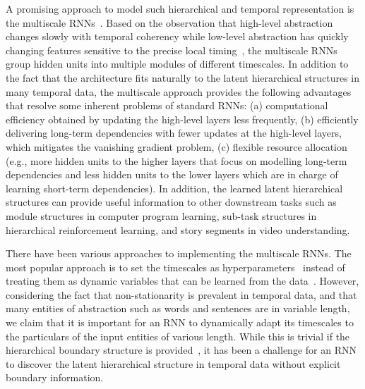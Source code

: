 \documentclass{article} %
\begin{document}
A promising approach to model such hierarchical and temporal representation is the multiscale RNNs~\citep{schmidhuber1992learning,el1995hierarchical,koutnik2014clockwork}.
Based on the observation that high-level abstraction changes slowly with temporal coherency 
while low-level abstraction has quickly changing features sensitive to the precise local timing~\citep{el1995hierarchical}, 
the multiscale RNNs group hidden units into multiple modules of different timescales. 
In addition to the fact that the architecture fits naturally to the latent hierarchical structures in many temporal data, 
the multiscale approach provides the following advantages that resolve some inherent problems of standard RNNs: 
(a) computational efficiency obtained by updating the high-level layers less frequently, 
(b) efficiently delivering long-term dependencies with fewer updates at the high-level layers, which mitigates the vanishing gradient problem, 
(c) flexible resource allocation (e.g., more hidden units to the higher layers that focus on modelling long-term dependencies and
less hidden units to the lower layers which are in charge of learning short-term dependencies).
In addition, the learned latent hierarchical structures can provide useful information to other downstream tasks such as module structures 
in computer program learning, sub-task structures in hierarchical reinforcement learning, and story segments in video understanding.

There have been various approaches to implementing the multiscale RNNs. The most popular approach is to set the timescales as hyperparameters~\citep{el1995hierarchical,koutnik2014clockwork,bahdanau2016end} 
instead of treating them as dynamic variables that can be learned from the data~\citep{schmidhuber1991neural,schmidhuber1992learning,chung2015gated,chung2016character}. 
However, considering the fact that non-stationarity is prevalent in temporal data, and that many entities of abstraction such as words and sentences are in variable length, 
we claim that it is important for an RNN to dynamically adapt its timescales to the particulars of the input entities of various length. 
While this is trivial if the hierarchical boundary structure is provided~\citep{sordoni2015hierarchical}, 
it has been a challenge for an RNN to discover the latent hierarchical structure in temporal data without explicit boundary information.  
\end{document}
